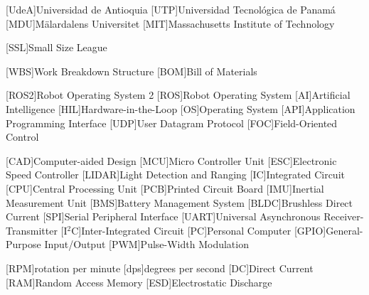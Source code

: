 
[UdeA]{Universidad de Antioquia}
[UTP]{Universidad Tecnológica de Panamá}
[MDU]{Mälardalens Universitet}
[MIT]{Massachusetts Institute of Technology}

[SSL]{Small Size League}

[WBS]{Work Breakdown Structure}
[BOM]{Bill of Materials}

[ROS2]{Robot Operating System 2}
[ROS]{Robot Operating System}
[AI]{Artificial Intelligence}
[HIL]{Hardware-in-the-Loop}
[OS]{Operating System}
[API]{Application Programming Interface}
[UDP]{User Datagram Protocol}
[FOC]{Field-Oriented Control}

[CAD]{Computer-aided Design}
[MCU]{Micro Controller Unit}
[ESC]{Electronic Speed Controller}
[LIDAR]{Light Detection and Ranging}
[IC]{Integrated Circuit}
[CPU]{Central Processing Unit}
[PCB]{Printed Circuit Board}
[IMU]{Inertial Measurement Unit}
[BMS]{Battery Management System}
[BLDC]{Brushless Direct Current}
[SPI]{Serial Peripheral Interface}
[UART]{Universal Asynchronous Receiver-Transmitter}
[I$^2$C]{Inter-Integrated Circuit}
[PC]{Personal Computer}
[GPIO]{General-Purpose Input/Output}
[PWM]{Pulse-Width Modulation}

[RPM]{rotation per minute}
[dps]{degrees per second}
[DC]{Direct Current}
[RAM]{Random Access Memory}
[ESD]{Electrostatic Discharge}

